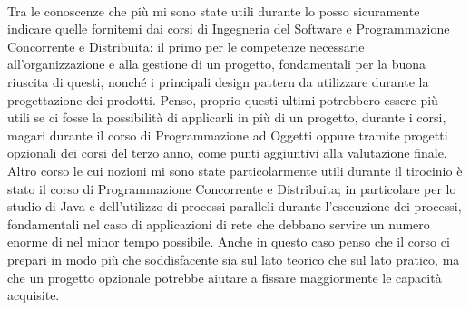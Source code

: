 \paragraph*{}
Tra le conoscenze che più mi sono state utili durante lo  posso sicuramente indicare quelle fornitemi dai corsi di Ingegneria del Software e Programmazione Concorrente e Distribuita: il primo per le competenze necessarie all'organizzazione e alla gestione di un progetto, fondamentali per la buona riuscita di questi, nonché i principali design pattern da utilizzare durante la progettazione dei prodotti. Penso, proprio questi ultimi potrebbero essere più utili se ci fosse la possibilità di applicarli in più di un progetto, durante i corsi, magari durante il corso di Programmazione ad Oggetti oppure tramite progetti opzionali dei corsi del terzo anno, come punti aggiuntivi alla valutazione finale. Altro corso le cui nozioni mi sono state particolarmente utili durante il tirocinio è stato il corso di Programmazione Concorrente e Distribuita; in particolare per lo studio di Java e dell'utilizzo di processi paralleli durante l'esecuzione dei processi, fondamentali nel caso di applicazioni di rete che debbano servire un numero enorme di  nel minor tempo possibile. Anche in questo caso penso che il corso ci prepari in modo più che soddisfacente sia sul lato teorico che sul lato pratico, ma che un progetto opzionale potrebbe aiutare a fissare maggiormente le capacità acquisite.